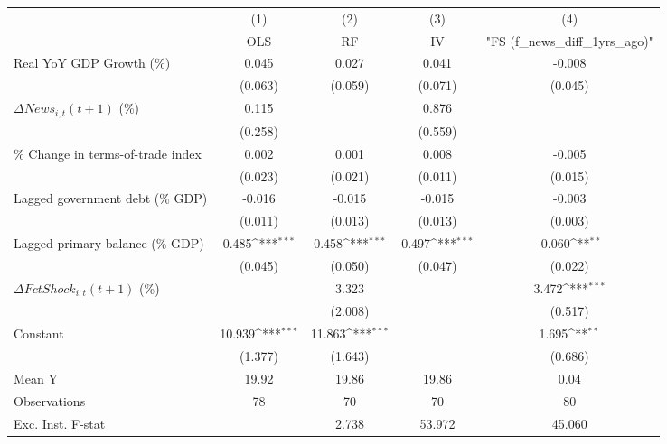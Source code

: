 {
\def\sym#1{\ifmmode^{#1}\else\(^{#1}\)\fi}
\begin{tabular}{l*{4}{c}}
\toprule
                    &\multicolumn{1}{c}{(1)}&\multicolumn{1}{c}{(2)}&\multicolumn{1}{c}{(3)}&\multicolumn{1}{c}{(4)}\\
                    &\multicolumn{1}{c}{OLS}&\multicolumn{1}{c}{RF}&\multicolumn{1}{c}{IV}&\multicolumn{1}{c}{ "FS (f_news_diff_1yrs_ago)" }\\
\midrule
Real YoY GDP Growth (\%)&       0.045         &       0.027         &       0.041         &      -0.008         \\
                    &     (0.063)         &     (0.059)         &     (0.071)         &     (0.045)         \\
\addlinespace
$ \Delta News_{i,t}(t+1)$ (\%)&       0.115         &                     &       0.876         &                     \\
                    &     (0.258)         &                     &     (0.559)         &                     \\
\addlinespace
\% Change in terms-of-trade index&       0.002         &       0.001         &       0.008         &      -0.005         \\
                    &     (0.023)         &     (0.021)         &     (0.011)         &     (0.015)         \\
\addlinespace
Lagged government debt (\% GDP)&      -0.016         &      -0.015         &      -0.015         &      -0.003         \\
                    &     (0.011)         &     (0.013)         &     (0.013)         &     (0.003)         \\
\addlinespace
Lagged primary balance (\% GDP)&       0.485\sym{***}&       0.458\sym{***}&       0.497\sym{***}&      -0.060\sym{**} \\
                    &     (0.045)         &     (0.050)         &     (0.047)         &     (0.022)         \\
\addlinespace
$ \Delta FctShock_{i,t}(t+1)$ (\%)&                     &       3.323         &                     &       3.472\sym{***}\\
                    &                     &     (2.008)         &                     &     (0.517)         \\
\addlinespace
Constant            &      10.939\sym{***}&      11.863\sym{***}&                     &       1.695\sym{**} \\
                    &     (1.377)         &     (1.643)         &                     &     (0.686)         \\
\midrule
Mean Y              &       19.92         &       19.86         &       19.86         &        0.04         \\
Observations        &          78         &          70         &          70         &          80         \\
Exc. Inst. F-stat   &                     &       2.738         &      53.972         &      45.060         \\
\bottomrule
\end{tabular}
}
